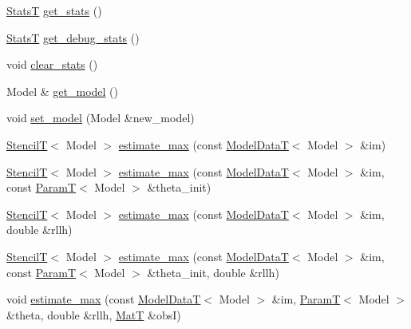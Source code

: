 \begin{DoxyCompactItemize}
\item 
\hyperlink{namespacemappel_a04ab395b0cf82c4ce68a36b2212649a5}{StatsT} \hyperlink{classmappel_1_1ThreadedEstimator_ab216e13ec19785839bc73caf7fac1c91}{get\+\_\+stats} ()
\item 
\hyperlink{namespacemappel_a04ab395b0cf82c4ce68a36b2212649a5}{StatsT} \hyperlink{classmappel_1_1ThreadedEstimator_ab281b131d160352ee949dd33d49cf55e}{get\+\_\+debug\+\_\+stats} ()
\item 
void \hyperlink{classmappel_1_1ThreadedEstimator_a8acce3a5a89128403c97b53bc3698d61}{clear\+\_\+stats} ()
\item 
Model \& \hyperlink{classmappel_1_1Estimator_a6c0b757d89033d70bdf03ad1fe6b03da}{get\+\_\+model} ()
\item 
void \hyperlink{classmappel_1_1Estimator_aacade4f66038545ad196edf7e8596187}{set\+\_\+model} (Model \&new\+\_\+model)
\item 
\hyperlink{namespacemappel_a3a06598240007876f8c4bf834ad86197}{StencilT}$<$ Model $>$ \hyperlink{classmappel_1_1Estimator_a4406c994d5b6239e75628ea5d479bfa2}{estimate\+\_\+max} (const \hyperlink{namespacemappel_a97f050df953605381ae9c901c3b125f1}{Model\+DataT}$<$ Model $>$ \&im)
\item 
\hyperlink{namespacemappel_a3a06598240007876f8c4bf834ad86197}{StencilT}$<$ Model $>$ \hyperlink{classmappel_1_1Estimator_aa8aa62047bfc28b1df3a9261da4f38a1}{estimate\+\_\+max} (const \hyperlink{namespacemappel_a97f050df953605381ae9c901c3b125f1}{Model\+DataT}$<$ Model $>$ \&im, const \hyperlink{namespacemappel_a667925cb0d6c0e49f2f035cc5a9a6857}{ParamT}$<$ Model $>$ \&theta\+\_\+init)
\item 
\hyperlink{namespacemappel_a3a06598240007876f8c4bf834ad86197}{StencilT}$<$ Model $>$ \hyperlink{classmappel_1_1Estimator_ab1be1fb34a71f9a46700c9d455fd5daf}{estimate\+\_\+max} (const \hyperlink{namespacemappel_a97f050df953605381ae9c901c3b125f1}{Model\+DataT}$<$ Model $>$ \&im, double \&rllh)
\item 
\hyperlink{namespacemappel_a3a06598240007876f8c4bf834ad86197}{StencilT}$<$ Model $>$ \hyperlink{classmappel_1_1Estimator_a2544f56248cb0f0763c964ddfaad32cc}{estimate\+\_\+max} (const \hyperlink{namespacemappel_a97f050df953605381ae9c901c3b125f1}{Model\+DataT}$<$ Model $>$ \&im, const \hyperlink{namespacemappel_a667925cb0d6c0e49f2f035cc5a9a6857}{ParamT}$<$ Model $>$ \&theta\+\_\+init, double \&rllh)
\item 
void \hyperlink{classmappel_1_1Estimator_a79f2d1c46789fed681985bb670e5ca37}{estimate\+\_\+max} (const \hyperlink{namespacemappel_a97f050df953605381ae9c901c3b125f1}{Model\+DataT}$<$ Model $>$ \&im, \hyperlink{namespacemappel_a667925cb0d6c0e49f2f035cc5a9a6857}{ParamT}$<$ Model $>$ \&theta, double \&rllh, \hyperlink{namespacemappel_a7091ab87c528041f7e2027195fad8915}{MatT} \&obsI)

\end{DoxyCompactItemize}
